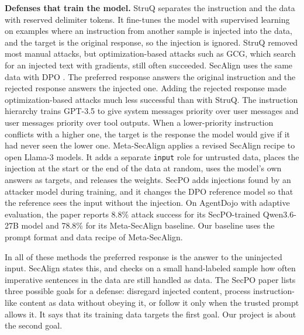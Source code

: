 \documentclass{article}
\begin{document}
\textbf{Defenses that train the model.} StruQ \cite{struq} separates the instruction and the data with reserved delimiter tokens. It fine-tunes the model with supervised learning on examples where an instruction from another sample is injected into the data, and the target is the original response, so the injection is ignored. StruQ removed most manual attacks, but optimization-based attacks such as GCG, which search for an injected text with gradients, still often succeeded. SecAlign \cite{secalign} uses the same data with DPO \cite{dpo}. The preferred response answers the original instruction and the rejected response answers the injected one. Adding the rejected response made optimization-based attacks much less successful than with StruQ. The instruction hierarchy \cite{ih} trains GPT-3.5 to give system messages priority over user messages and user messages priority over tool outputs. When a lower-priority instruction conflicts with a higher one, the target is the response the model would give if it had never seen the lower one. Meta-SecAlign \cite{metasecalign} applies a revised SecAlign recipe to open Llama-3 models. It adds a separate \texttt{input} role for untrusted data, places the injection at the start or the end of the data at random, uses the model's own answers as targets, and releases the weights. SecPO \cite{secpo} adds injections found by an attacker model during training, and it changes the DPO reference model so that the reference sees the input without the injection. On AgentDojo with adaptive evaluation, the paper reports 8.8\% attack success for its SecPO-trained Qwen3.6-27B model and 78.8\% for its Meta-SecAlign baseline. Our baseline uses the prompt format and data recipe of Meta-SecAlign.

In all of these methods the preferred response is the answer to the uninjected input. SecAlign states this, and checks on a small hand-labeled sample how often imperative sentences in the data are still handled as data. The SecPO paper lists three possible goals for a defense: disregard injected content, process instruction-like content as data without obeying it, or follow it only when the trusted prompt allows it. It says that its training data targets the first goal. Our project is about the second goal.
\end{document}
